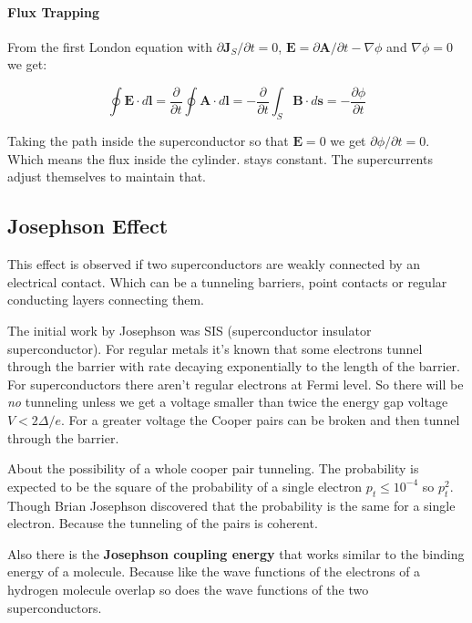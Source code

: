 \documentclass[12pt]{article}
\numberwithin{equation}{subsection}
\newcommand\page[1]{
{
}
}
\begin{document}
\paragraph{Flux Trapping\\}
From the first London equation with $\partial\mathbf J_S/\partial t = 0 $, $\mathbf E=\partial\mathbf A/\partial t - \nabla \phi$ and $\nabla \phi = 0$ we get:

\begin{equation}
    \oint \mathbf E \cdot d\mathbf l = \frac{\partial}{\partial t} \oint \mathbf A \cdot d \mathbf l = -\frac{\partial}{\partial t} \int_S \mathbf B \cdot d \mathbf s = - \frac{\partial \phi}{\partial t}  
\end{equation}

Taking the path inside the superconductor so that $\mathbf E = 0$ we get $\partial \phi /\partial t = 0$. Which means the flux inside the cylinder.
stays constant. The supercurrents adjust themselves to maintain that.

\page{32}

\subsection{Josephson Effect}

This effect is observed if two superconductors are weakly connected by an electrical contact. Which can be a tunneling barriers, point contacts or regular conducting layers connecting them. 

The initial work by Josephson was SIS (superconductor insulator superconductor). For regular metals it's known that some electrons tunnel through the barrier with rate decaying exponentially to the length of the barrier. For superconductors there aren't regular electrons at Fermi level. So there will be \emph{no} tunneling unless we get a voltage smaller than twice the energy gap voltage $V<2\Delta /e$. For a greater voltage the Cooper pairs can be broken and then tunnel through the barrier.

About the possibility of a whole cooper pair tunneling. The probability is expected to be the square of the probability of a single electron $p_t\le 10^{-4}$ so $p_t^2$. Though Brian Josephson discovered that the probability is the same for a single electron. Because the tunneling of the pairs is coherent.

Also there is the \textbf{Josephson coupling energy} that works similar to the binding energy of a molecule. Because like the wave functions of the electrons of a hydrogen molecule overlap so does the wave functions of the two superconductors.
\end{document}
